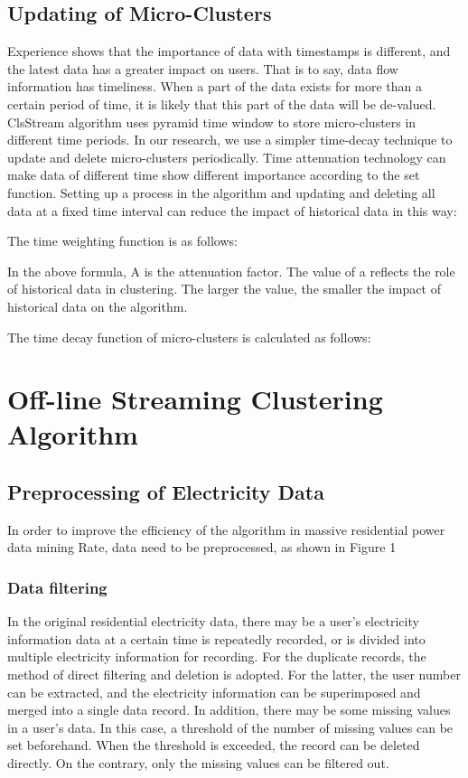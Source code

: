 \documentclass[runningheads]{llncs}
\begin{document}
\subsection{Updating of Micro-Clusters}
Experience shows that the importance of data with timestamps is different, and the latest data has a greater impact on users. That is to say, data flow information has timeliness. When a part of the data exists for more than a certain period of time, it is likely that this part of the data will be de-valued. ClsStream algorithm uses pyramid time window to store micro-clusters in different time periods. In our research, we use a simpler time-decay technique to update and delete micro-clusters periodically. Time attenuation technology can make data of different time show different importance according to the set function. Setting up a process in the algorithm and updating and deleting all data at a fixed time interval can reduce the impact of historical data in this way:

The time weighting function is as follows:

In the above formula, A is the attenuation factor. The value of a reflects the role of historical data in clustering. The larger the value, the smaller the impact of historical data on the algorithm.

The time decay function of micro-clusters is calculated as follows:

\section{Off-line Streaming Clustering Algorithm}
\subsection{Preprocessing of Electricity Data}
In order to improve the efficiency of the algorithm in massive residential power data mining Rate, data need to be preprocessed, as shown in Figure 1
\subsubsection{Data filtering}
In the original residential electricity data, there may be a user's electricity information data at a certain time is repeatedly recorded, or is divided into multiple electricity information for recording. For the duplicate records, the method of direct filtering and deletion is adopted. For the latter, the user number can be extracted, and the electricity information can be superimposed and merged into a single data record. In addition, there may be some missing values in a user's data. In this case, a threshold of the number of missing values can be set beforehand. When the threshold is exceeded, the record can be deleted directly. On the contrary, only the missing values can be filtered out.
\end{document}
